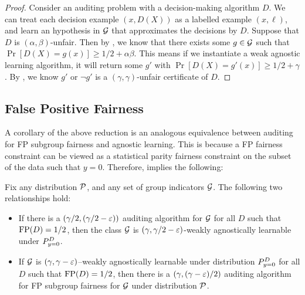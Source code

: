 \begin{proof}
  Consider an auditing problem with a decision-making algorithm $D$.
  We can treat each decision example $(x, D(X))$ as a labelled example
  $(x, \ell)$, and learn an hypothesis in $\mathcal{G}$ that approximates the
  decisions by $D$.  Suppose that $D$ is $(\alpha,
  \beta)$-unfair. Then by , we know that there exists
  some $g\in \mathcal{G}$ such that $\Pr[D(X) = g(x)] \geq 1/2 +
  \alpha\beta$. This means if we instantiate a weak agnostic learning
  algorithm, it will return some $g'$ with
  $\Pr[D(X) = g'(x)] \geq 1/2 + \gamma$. By , we know
  $g'$ or $\neg g'$ is a $(\gamma, \gamma)$-unfair certificate of $D$.
\end{proof}
\fi

\subsection{False Positive Fairness}

A corollary of the above reduction is an analogous equivalence between
auditing for FP subgroup fairness and agnostic learning. This is
because a FP fairness constraint can be viewed as a statistical parity
fairness constraint on the subset of the data such that $y =
0$. Therefore,  implies the following:

\begin{corollary}
\label{cor:reduction2}
  Fix any distribution $\mathcal{P}$, and any set of group indicators $\mathcal{G}$. %
  The following
  two relationships hold:
\begin{itemize}
\item If there is a $(\gamma/2, (\gamma/2 - \varepsilon))$ auditing algorithm
  for $\mathcal{G}$ for all $D$ such that ${\mathrm{FP}}(D) = 1/2$,
  then the class $\mathcal{G}$ is
  $(\gamma, \gamma/2 - \varepsilon)$-weakly agnostically learnable under $P_{y=0}^D$.
\item If $\mathcal{G}$ is $(\gamma, \gamma - \varepsilon)$--weakly agnostically
  learnable under distribution $P_{y=0}^D$ for all $D$ such that
  ${\mathrm{FP}}(D) = 1/2$, then there is
  a $(\gamma, (\gamma - \varepsilon)/2)$ auditing algorithm for FP subgroup
  fairness for $\mathcal{G}$ under distribution
  $\mathcal{P}$. %
\end{itemize}
\end{corollary}


